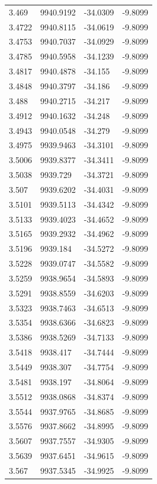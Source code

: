 \begin{table}[H]
\begin{tabular}{llll}
3.469 & 9940.9192 & -34.0309 & -9.8099 \\
3.4722 & 9940.8115 & -34.0619 & -9.8099 \\
3.4753 & 9940.7037 & -34.0929 & -9.8099 \\
3.4785 & 9940.5958 & -34.1239 & -9.8099 \\
3.4817 & 9940.4878 & -34.155 & -9.8099 \\
3.4848 & 9940.3797 & -34.186 & -9.8099 \\
3.488 & 9940.2715 & -34.217 & -9.8099 \\
3.4912 & 9940.1632 & -34.248 & -9.8099 \\
3.4943 & 9940.0548 & -34.279 & -9.8099 \\
3.4975 & 9939.9463 & -34.3101 & -9.8099 \\
3.5006 & 9939.8377 & -34.3411 & -9.8099 \\
3.5038 & 9939.729 & -34.3721 & -9.8099 \\
3.507 & 9939.6202 & -34.4031 & -9.8099 \\
3.5101 & 9939.5113 & -34.4342 & -9.8099 \\
3.5133 & 9939.4023 & -34.4652 & -9.8099 \\
3.5165 & 9939.2932 & -34.4962 & -9.8099 \\
3.5196 & 9939.184 & -34.5272 & -9.8099 \\
3.5228 & 9939.0747 & -34.5582 & -9.8099 \\
3.5259 & 9938.9654 & -34.5893 & -9.8099 \\
3.5291 & 9938.8559 & -34.6203 & -9.8099 \\
3.5323 & 9938.7463 & -34.6513 & -9.8099 \\
3.5354 & 9938.6366 & -34.6823 & -9.8099 \\
3.5386 & 9938.5269 & -34.7133 & -9.8099 \\
3.5418 & 9938.417 & -34.7444 & -9.8099 \\
3.5449 & 9938.307 & -34.7754 & -9.8099 \\
3.5481 & 9938.197 & -34.8064 & -9.8099 \\
3.5512 & 9938.0868 & -34.8374 & -9.8099 \\
3.5544 & 9937.9765 & -34.8685 & -9.8099 \\
3.5576 & 9937.8662 & -34.8995 & -9.8099 \\
3.5607 & 9937.7557 & -34.9305 & -9.8099 \\
3.5639 & 9937.6451 & -34.9615 & -9.8099 \\
3.567 & 9937.5345 & -34.9925 & -9.8099 \\

\end{tabular}
\end{table}

